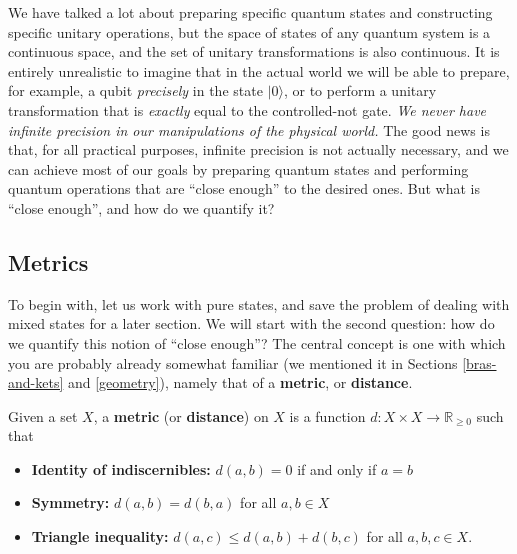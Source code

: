 \documentclass[fleqn,a4paper]{article}
\providecommand{\tightlist}{\setlength{\itemsep}{0pt}\setlength{\parskip}{0pt}}
\newenvironment{idea}{\everypar{\setlength{\parindent}{1.5em}}}{}
\theoremstyle{definition}
\theoremstyle{definition}
\theoremstyle{definition}
\theoremstyle{definition}
\theoremstyle{remark}
\begin{document}
We have talked a lot about preparing specific quantum states and constructing specific unitary operations, but the space of states of any quantum system is a continuous space, and the set of unitary transformations is also continuous.
It is entirely unrealistic to imagine that in the actual world we will be able to prepare, for example, a qubit \emph{precisely} in the state \(|0\rangle\), or to perform a unitary transformation that is \emph{exactly} equal to the controlled-not gate.
\emph{We never have infinite precision in our manipulations of the physical world.}
The good news is that, for all practical purposes, infinite precision is not actually necessary, and we can achieve most of our goals by preparing quantum states and performing quantum operations that are ``close enough'' to the desired ones.
But what is ``close enough'', and how do we quantify it?

\hypertarget{metrics}{%
\subsection{Metrics}\label{metrics}}

To begin with, let us work with pure states, and save the problem of dealing with mixed states for a later section.
We will start with the second question: how do we quantify this notion of ``close enough''?
The central concept is one with which you are probably already somewhat familiar (we mentioned it in Sections \ref{bras-and-kets} and \ref{geometry}), namely that of a \textbf{metric}, or \textbf{distance}.

\begin{idea}

Given a set \(X\), a \textbf{metric} (or \textbf{distance}) on \(X\) is a function \(d\colon X\times X\to\mathbb{R}_{\geqslant 0}\) such that

\begin{itemize}
\tightlist
\item
  \textbf{Identity of indiscernibles:} \(d(a,b)=0\) if and only if \(a=b\)
\item
  \textbf{Symmetry:} \(d(a,b)=d(b,a)\) for all \(a,b\in X\)
\item
  \textbf{Triangle inequality:} \(d(a,c)\leqslant d(a,b)+d(b,c)\) for all \(a,b,c\in X\).
\end{itemize}

\end{idea}
\end{document}
